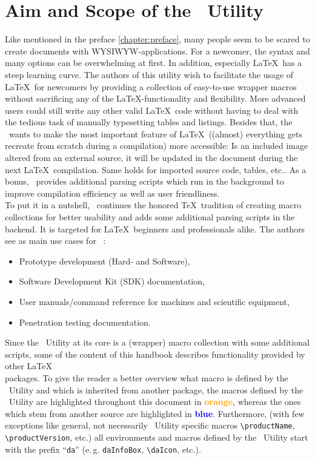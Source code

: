 \chapter{Aim and Scope of the \productName~Utility}
	Like mentioned in the preface \ref{chapter:preface}, many people seem to be scared to create documents with WYSIWYW-applications. For a newcomer, the syntax and many options can be overwhelming at first. In addition, especially \LaTeX~has a steep learning curve. The authors of this utility wish to facilitate the usage of \LaTeX~for newcomers by providing a collection of easy-to-use wrapper macros without sacrificing any of the \LaTeX-functionality and flexibility. More advanced users could still write any other valid \LaTeX~code without having to deal with the tedious task of manually typesetting tables and listings. Besides that, the \productName~wants to make the most important feature of \LaTeX~((almost) everything gets recreate from scratch during a compilation) more accessible: Is an included image altered from an external source, it will be updated in the document during the next \LaTeX~compilation. Same holds for imported source code, tables, etc.. As a bonus, \productName~provides additional parsing scripts which run in the background to improve compilation efficiency as well as user friendliness. \\ 
	To put it in a nutshell, \productName~continues the honored \TeX~tradition of creating macro collections for better usability and adds some additional parsing scripts in the backend. It is targeted for \LaTeX~beginners and professionals alike. The authors see as main use cases for \productName~\productVersion:
	\begin{itemize}
		\item Prototype development (Hard- and Software),
		\item Software Development Kit (SDK) documentation,
		\item User manuals/command reference for machines and scientific equipment,
		\item Penetration testing documentation.
	\end{itemize}

	Since the \productName~Utility at its core is a (wrapper) macro collection with some additional scripts, some of the content of this handbook describes
	functionality provided by other \LaTeX\\packages. To give the reader a better overview what macro is defined by the \productName~Utility and which is inherited from another package, the macros defined by the \productName~Utility are highlighted throughout this document in \textcolor{orange}{\bfseries orange}, whereas the ones which stem from another source are highlighted in \textcolor{blue}{\bfseries blue}. Furthermore, (with few exceptions like general, not necessarily \productName~Utility specific macros \lstinline[style=LaTeX]$\productName$, \lstinline[style=LaTeX]$\productVersion$, etc.) all environments and macros defined by the \productName~Utility start with the prefix \enquote{\lstinline$da$} (\mbox{e.\,g.} \lstinline[style=LaTeX]$daInfoBox$, \lstinline[style=LaTeX]$\daIcon$, etc.). 

